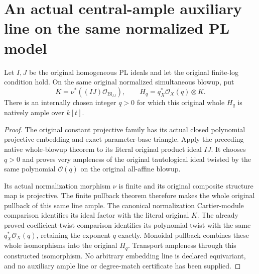 \section{An actual central-ample auxiliary line on the same normalized PL model}

\begin{theorem}
\label{thm:pl-original-normalized-tautological-auxiliary-ample}
\leanok
{}
Let $I,J$ be the original homogeneous PL ideals and let the
original finite-log condition hold. On the same original
normalized simultaneous blowup, put
\[
 K=\nu^*((IJ)\mathcal O_{\operatorname{Bl}_{IJ}}),\qquad
 H_q=q_X^*\mathcal O_X(q)\otimes K.
\]
There is an internally chosen integer $q>0$ for which this
original whole $H_q$ is natively ample over $k[t]$.
\end{theorem}
\begin{proof}
\leanok
The original constant projective family has its actual closed
polynomial projective embedding and exact parameter-base triangle.
Apply the preceding native whole-blowup theorem to its literal
original product ideal $IJ$. It chooses $q>0$ and proves very
ampleness of the original tautological ideal twisted by the same
polynomial $\mathcal O(q)$ on the original all-affine blowup.

Its actual normalization morphism $\nu$ is finite and its
original composite structure map is projective. The finite
pullback theorem therefore makes the whole original pullback of
this same line ample. The canonical normalization Cartier-module
comparison identifies its ideal factor with the literal original
$K$. The already proved coefficient-twist comparison identifies
its polynomial twist with the same $q_X^*\mathcal O_X(q)$,
retaining the exponent $q$ exactly. Monoidal pullback combines
these whole isomorphisms into the original $H_q$. Transport
ampleness through this constructed isomorphism. No arbitrary
embedding line is declared equivariant, and no auxiliary ample
line or degree-match certificate has been supplied.
\end{proof}

